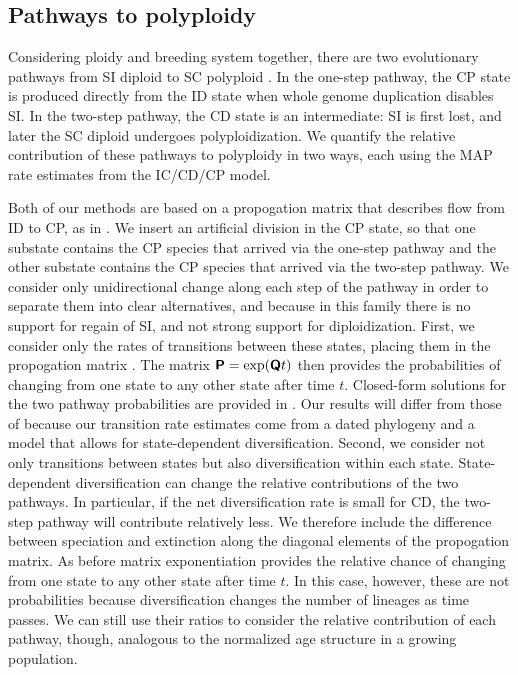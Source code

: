 \subsection{Pathways to polyploidy}

Considering ploidy and breeding system together, there are two evolutionary pathways from SI diploid to SC polyploid \citep{brunet2001, robertson_2011}.
In the one-step pathway, the CP state is produced directly from the ID state when whole genome duplication disables SI.
In the two-step pathway, the CD state is an intermediate: SI is first lost, and later the SC diploid undergoes polyploidization.
We quantify the relative contribution of these pathways to polyploidy in two ways, each using the MAP rate estimates from the IC/CD/CP model.

Both of our methods are based on a propogation matrix that describes flow from ID to CP, as in \citet{robertson_2011}.
We insert an artificial division in the CP state, so that one substate contains the CP species that arrived via the one-step pathway and the other substate contains the CP species that arrived via the two-step pathway.
We consider only unidirectional change along each step of the pathway in order to separate them into clear alternatives, and because in this family there is no support for regain of SI, and not strong support for diploidization.
First, we consider only the rates of transitions between these states, placing them in the propogation matrix .
The matrix $\bm{\mathsf{P}} = \exp(\bm{\mathsf{Q}} t)$ then provides the probabilities of changing from one state to any other state after time $t$.
Closed-form solutions for the two pathway probabilities are provided in \citet{robertson_2011}.
Our results will differ from those of \citet{robertson_2011} because our transition rate estimates come from a dated phylogeny and a model that allows for state-dependent diversification.
%
Second, we consider not only transitions between states but also diversification within each state.
State-dependent diversification can change the relative contributions of the two pathways.
In particular, if the net diversification rate is small for CD, the two-step pathway will contribute relatively less.
We therefore include the difference between speciation and extinction along the diagonal elements of the propogation matrix.
As before matrix exponentiation provides the relative chance of changing from one state to any other state after time $t$.
In this case, however, these are not probabilities because diversification changes the number of lineages as time passes.
We can still use their ratios to consider the relative contribution of each pathway, though, analogous to the normalized age structure in a growing population.


